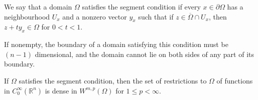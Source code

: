 \begin{para}
  We say that a domain $\Omega$ satisfies the segment condition if every $x \in\partial\Omega$
  has a neighbourhood $U_x$ and a nonzero vector $y_x$ such that if $z \in \overline{\Omega} \cap U_x$, 
  then $z+t y_x \in \Omega$ for $0<t<1$.

  If nonempty, the boundary of a domain satisfying this condition must be $(n-1)$ dimensional,
  and the domain cannot lie on both sides of any part of its boundary.
\end{para}


\begin{theorem}
  If $\Omega$ satisfies the segment condition, then the set of restrictions to $\Omega$
  of functions in $C_0^{\infty}\left(\mathbb{R}^n\right)$ is dense in $W^{m,p}(\Omega)$
  for $1 \leq p<\infty$.
\end{theorem}

